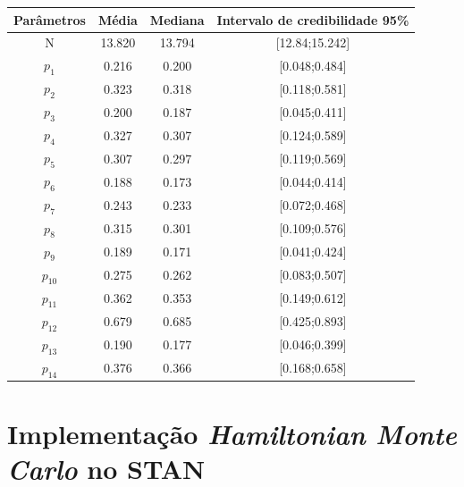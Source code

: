 \documentclass[a4paper,12pt,twoside]{article}
\begin{document}
\begin{table}[ht]
\centering
\begin{tabular}{cccc}
  \hline
Parâmetros & Média & Mediana & Intervalo de credibilidade 95\% \\ 
  \hline
N & 13.820 & 13.794 & [12.84;15.242] \\ 
$p_1$ & 0.216 & 0.200 & [0.048;0.484] \\ 
$p_2$ & 0.323 & 0.318 & [0.118;0.581] \\ 
$p_3$ & 0.200 & 0.187 & [0.045;0.411] \\ 
$p_4$ & 0.327 & 0.307 & [0.124;0.589] \\ 
$p_5$ & 0.307 & 0.297 & [0.119;0.569] \\ 
$p_6$ & 0.188 & 0.173 & [0.044;0.414] \\ 
$p_7$ & 0.243 & 0.233 & [0.072;0.468] \\ 
$p_8$ & 0.315 & 0.301 & [0.109;0.576] \\ 
$p_9$ & 0.189 & 0.171 & [0.041;0.424] \\ 
$p_{10}$ & 0.275 & 0.262 & [0.083;0.507] \\ 
$p_{11}$ & 0.362 & 0.353 & [0.149;0.612] \\ 
$p_{12}$ & 0.679 & 0.685 & [0.425;0.893] \\ 
$p_{13}$ & 0.190 & 0.177 & [0.046;0.399] \\ 
$p_{14}$ & 0.376 & 0.366 & [0.168;0.658] \\ 
   \hline
\end{tabular}
\end{table}


\newpage
\section{Implementação \textit{Hamiltonian Monte Carlo} no STAN}
\end{document}
